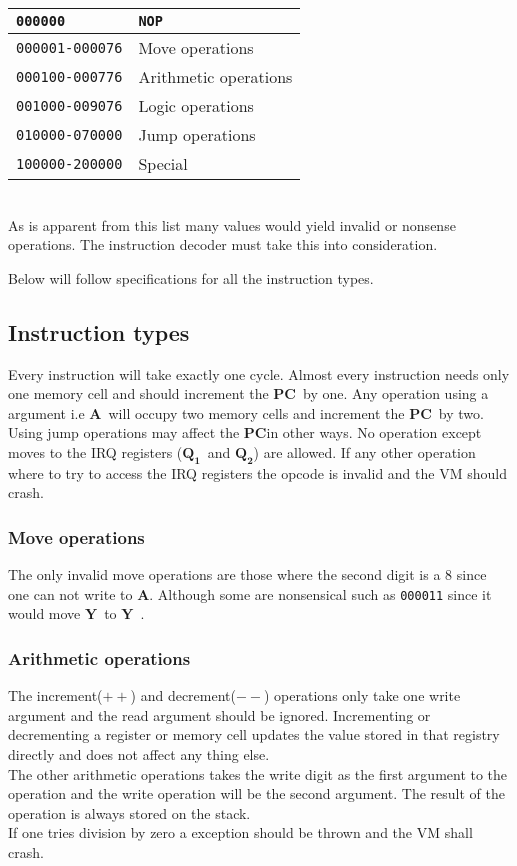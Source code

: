 \documentclass{article}
\newcommand{\y}{$\textbf{Y}$}
\newcommand{\A}{$\textbf{A}$}
\newcommand{\q}{$\textbf{Q}_{\textbf{1}}$}
\newcommand{\qq}{$\textbf{Q}_{\textbf{2}}$}
\newcommand{\pc}{$\textbf{PC}$}
\newcommand{\V}{\verb}
\begin{document}
\begin{tabular}{l l}
  \V+000000+ & \V+NOP+ \\
  \hline
  \V+000001-000076+ & Move operations \\
  \hline
  \V+000100-000776+ & Arithmetic operations \\
  \hline
  \V+001000-009076+ & Logic operations \\
  \hline
  \V+010000-070000+ & Jump operations \\
  \hline
  \V+100000-200000+ & Special \\
\end{tabular} \\
As is apparent from this list many values would yield invalid or
nonsense operations.
The instruction decoder must take this into consideration.

Below will follow specifications for all the instruction types.

\subsection{Instruction types}
Every instruction will take exactly one cycle. Almost every instruction needs
only one memory cell and should increment the \pc \  by one.
Any operation using  a argument i.e \A \ will occupy two memory cells and
increment the \pc \ by two.\\
Using jump operations may affect the \pc in other ways.
No operation except moves to the IRQ registers (\q \ and \qq ) are allowed.
If any other operation where to try to access the IRQ registers the opcode is
invalid and the VM should crash.

\subsubsection{Move operations}
The only invalid move operations are those where the second digit is a 8 since
one can not write to \A.
Although some are nonsensical such as \V+000011+ since it would move \y \ to \y \ .

\subsubsection{Arithmetic operations}
The increment($++$) and decrement($--$) operations only take one write argument
and the read argument should be ignored. Incrementing or decrementing a register
or memory cell updates the value stored in that registry directly and does not
affect any thing else.\\
The other arithmetic operations takes the write digit as the first argument to
the operation and the write operation will be the second argument.
The result of the operation is always stored on the stack.\\
If one tries division by zero a exception should be thrown and the VM shall 
crash.
\end{document}
